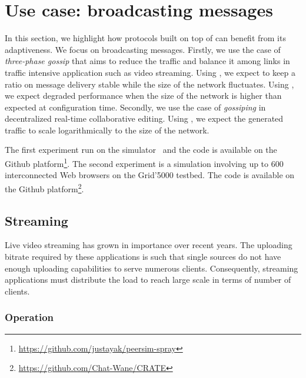 
\section{Use case: broadcasting messages}


In this section, we highlight how protocols built on top of \SPRAY can benefit
from its adaptiveness. We focus on broadcasting messages. Firstly, we use the
case of \emph{three-phase gossip} that aims to reduce the traffic and balance it
among links in traffic intensive application such as video streaming. Using
\SPRAY, we expect to keep a ratio on message delivery stable while the size of
the network fluctuates. Using \CYCLON, we expect degraded performance when the
size of the network is higher than expected at configuration time. Secondly, we
use the case of \emph{gossiping} in decentralized real-time collaborative
editing. Using \SPRAY, we expect the generated traffic to scale logarithmically
to the size of the network.

The first experiment run on the \PEERSIM simulator~\cite{montresor2009peersim}
and the code is available on the Github
platform\footnote{\url{https://github.com/justayak/peersim-spray}}. The second
experiment is a simulation involving up to 600 interconnected Web browsers on
the Grid'5000 testbed. The code is available on the Github
platform\footnote{\url{https://github.com/Chat-Wane/CRATE}}.

\subsection{Streaming}

Live video streaming has grown in importance over recent years. The uploading
bitrate required by these applications is such that single sources do not have
enough uploading capabilities to serve numerous clients. Consequently, streaming
applications must distribute the load to reach large scale in terms of number of
clients.

\subsubsection{Operation}

